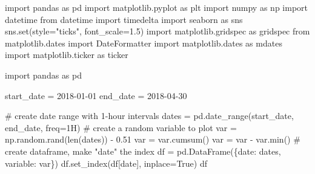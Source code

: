 \documentclass[
  letterpaper,
  DIV=11,
  numbers=noendperiod,
  oneside]{scrreprt}
\newenvironment{Shaded}{\begin{snugshade}}{\end{snugshade}}
\newcommand{\BuiltInTok}[1]{\textcolor[rgb]{0.00,0.23,0.31}{#1}}
\newcommand{\CommentTok}[1]{\textcolor[rgb]{0.37,0.37,0.37}{#1}}
\newcommand{\FloatTok}[1]{\textcolor[rgb]{0.68,0.00,0.00}{#1}}
\newcommand{\ImportTok}[1]{\textcolor[rgb]{0.00,0.46,0.62}{#1}}
\newcommand{\NormalTok}[1]{\textcolor[rgb]{0.00,0.23,0.31}{#1}}
\newcommand{\OperatorTok}[1]{\textcolor[rgb]{0.37,0.37,0.37}{#1}}
\newcommand{\StringTok}[1]{\textcolor[rgb]{0.13,0.47,0.30}{#1}}
\newcommand{\VariableTok}[1]{\textcolor[rgb]{0.07,0.07,0.07}{#1}}
\begin{document}
\begin{Shaded}
\begin{Highlighting}[]
\ImportTok{import}\NormalTok{ pandas }\ImportTok{as}\NormalTok{ pd}
\ImportTok{import}\NormalTok{ matplotlib.pyplot }\ImportTok{as}\NormalTok{ plt}
\ImportTok{import}\NormalTok{ numpy }\ImportTok{as}\NormalTok{ np}
\ImportTok{import}\NormalTok{ datetime}
\ImportTok{from}\NormalTok{ datetime }\ImportTok{import}\NormalTok{ timedelta}
\ImportTok{import}\NormalTok{ seaborn }\ImportTok{as}\NormalTok{ sns}
\NormalTok{sns.}\BuiltInTok{set}\NormalTok{(style}\OperatorTok{=}\StringTok{"ticks"}\NormalTok{, font\_scale}\OperatorTok{=}\FloatTok{1.5}\NormalTok{)}
\ImportTok{import}\NormalTok{ matplotlib.gridspec }\ImportTok{as}\NormalTok{ gridspec}
\ImportTok{from}\NormalTok{ matplotlib.dates }\ImportTok{import}\NormalTok{ DateFormatter}
\ImportTok{import}\NormalTok{ matplotlib.dates }\ImportTok{as}\NormalTok{ mdates}
\ImportTok{import}\NormalTok{ matplotlib.ticker }\ImportTok{as}\NormalTok{ ticker}
\end{Highlighting}
\end{Shaded}

\begin{Shaded}
\begin{Highlighting}[]
\ImportTok{import}\NormalTok{ pandas }\ImportTok{as}\NormalTok{ pd}

\NormalTok{start\_date }\OperatorTok{=} \StringTok{\textquotesingle{}2018{-}01{-}01\textquotesingle{}}
\NormalTok{end\_date }\OperatorTok{=} \StringTok{\textquotesingle{}2018{-}04{-}30\textquotesingle{}}

\CommentTok{\# create date range with 1{-}hour intervals}
\NormalTok{dates }\OperatorTok{=}\NormalTok{ pd.date\_range(start\_date, end\_date, freq}\OperatorTok{=}\StringTok{\textquotesingle{}1H\textquotesingle{}}\NormalTok{)}
\CommentTok{\# create a random variable to plot}
\NormalTok{var }\OperatorTok{=}\NormalTok{ np.random.rand(}\BuiltInTok{len}\NormalTok{(dates)) }\OperatorTok{{-}} \FloatTok{0.51}
\NormalTok{var }\OperatorTok{=}\NormalTok{ var.cumsum()}
\NormalTok{var }\OperatorTok{=}\NormalTok{ var }\OperatorTok{{-}}\NormalTok{ var.}\BuiltInTok{min}\NormalTok{()}
\CommentTok{\# create dataframe, make "date" the index}
\NormalTok{df }\OperatorTok{=}\NormalTok{ pd.DataFrame(\{}\StringTok{\textquotesingle{}date\textquotesingle{}}\NormalTok{: dates, }\StringTok{\textquotesingle{}variable\textquotesingle{}}\NormalTok{: var\})}
\NormalTok{df.set\_index(df[}\StringTok{\textquotesingle{}date\textquotesingle{}}\NormalTok{], inplace}\OperatorTok{=}\VariableTok{True}\NormalTok{)}
\NormalTok{df}
\end{Highlighting}
\end{Shaded}
\end{document}

